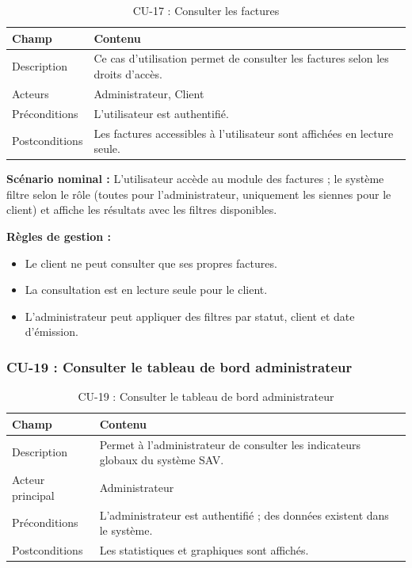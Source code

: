 \begin{table}[H]
\centering
\caption{CU-17 : Consulter les factures}
\label{tab:ch5:cu17}
\begin{tabular}{|p{3.5cm}|p{11cm}|}
\hline
\textbf{Champ} & \textbf{Contenu} \\
\hline
Description & Ce cas d'utilisation permet de consulter les factures selon les droits d'accès. \\
\hline
Acteurs & Administrateur, Client \\
\hline
Préconditions & L'utilisateur est authentifié. \\
\hline
Postconditions & Les factures accessibles à l'utilisateur sont affichées en lecture seule. \\
\hline
\end{tabular}
\end{table}

\textbf{Scénario nominal :} L'utilisateur accède au module des factures ; le système filtre selon le rôle (toutes pour l'administrateur, uniquement les siennes pour le client) et affiche les résultats avec les filtres disponibles.

\textbf{Règles de gestion :}

\begin{itemize}
    \item Le client ne peut consulter que ses propres factures.
    \item La consultation est en lecture seule pour le client.
    \item L'administrateur peut appliquer des filtres par statut, client et date d'émission.
\end{itemize}

\subsubsection{CU-19 : Consulter le tableau de bord administrateur}

\begin{table}[H]
\centering
\caption{CU-19 : Consulter le tableau de bord administrateur}
\label{tab:ch5:cu19}
\begin{tabular}{|p{3.5cm}|p{11cm}|}
\hline
\textbf{Champ} & \textbf{Contenu} \\
\hline
Description & Permet à l'administrateur de consulter les indicateurs globaux du système SAV. \\
\hline
Acteur principal & Administrateur \\
\hline
Préconditions & L'administrateur est authentifié ; des données existent dans le système. \\
\hline
Postconditions & Les statistiques et graphiques sont affichés. \\
\hline
\end{tabular}
\end{table}

